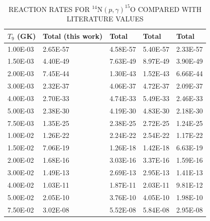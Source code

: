 \begin{table}[]
\caption{REACTION RATES FOR $^{14}$N$(p,\gamma)^{15}$O COMPARED WITH LITERATURE VALUES}
\begin{center}
\begin{threeparttable}
\begin{tabular}{@{}lllll@{}}
\toprule
$T_{9}$ (GK)       & Total (this work) & Total \cite{Caughlan1988} & Total \cite{Angulo1999} & Total \cite{Imbriani2005} \\ \midrule
1.00E-03 & 2.65E-57          & 4.58E-57                  & 5.40E-57                & 2.33E-57                  \\
1.50E-03 & 4.40E-49          & 7.63E-49                  & 8.97E-49                & 3.90E-49                  \\
2.00E-03 & 7.45E-44          & 1.30E-43                  & 1.52E-43                & 6.66E-44                  \\
3.00E-03 & 2.32E-37          & 4.06E-37                  & 4.72E-37                & 2.09E-37                  \\
4.00E-03 & 2.70E-33          & 4.74E-33                  & 5.49E-33                & 2.46E-33                  \\
5.00E-03 & 2.38E-30          & 4.19E-30                  & 4.83E-30                & 2.18E-30                  \\
7.50E-03 & 1.35E-25          & 2.38E-25                  & 2.72E-25                & 1.24E-25                  \\
1.00E-02 & 1.26E-22          & 2.24E-22                  & 2.54E-22                & 1.17E-22                  \\
1.50E-02 & 7.06E-19          & 1.26E-18                  & 1.42E-18                & 6.63E-19                  \\
2.00E-02 & 1.68E-16          & 3.03E-16                  & 3.37E-16                & 1.59E-16                  \\
3.00E-02 & 1.49E-13          & 2.69E-13                  & 2.95E-13                & 1.41E-13                  \\
4.00E-02 & 1.03E-11          & 1.87E-11                  & 2.03E-11                & 9.81E-12                  \\
5.00E-02 & 2.05E-10          & 3.76E-10                  & 4.05E-10                & 1.98E-10                  \\
7.50E-02 & 3.02E-08          & 5.52E-08                  & 5.84E-08                & 2.95E-08                  \\

\end{tabular}
\end{threeparttable}
\end{center}
\end{table}
